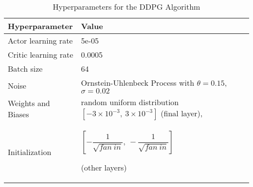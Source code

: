 \begin{table}[H]
    \centering
    \caption{Hyperparameters for the DDPG Algorithm}
    \begin{tabular}{lll} \toprule
        Hyperparameter & Value \\
        \midrule
        Actor learning rate & 5e-05\\ \hline
        Critic learning rate & 0.0005\\ \hline
        Batch size & 64\\ \hline
        Noise & Ornstein-Uhlenbeck Process with $\theta=0.15$, $\sigma=0.02$ \\ \hline
        Weights and Biases  & random uniform distribution $[-3\times10^{-3},\:3\times10^{-3}]$ (final layer), \\
        Initialization    & \begin{tiny}$\left[-\dfrac{1}{\sqrt{fan\:in}},\:-\dfrac{1}{\sqrt{fan\:in}}\right]$\end{tiny} (other layers)\\        \bottomrule
    \end{tabular}
    \label{tab:ddpg_hyps}
\end{table}

